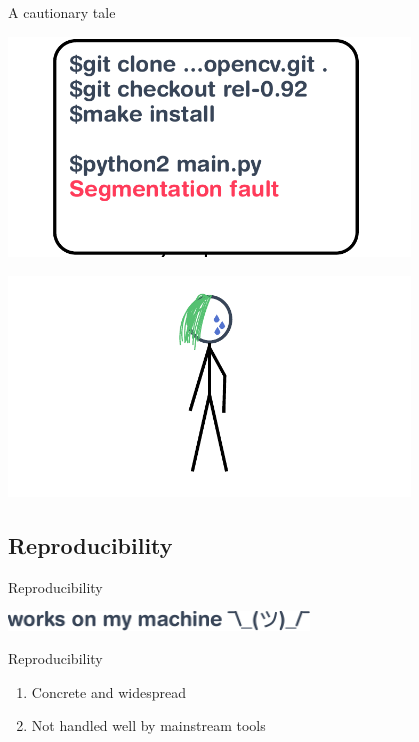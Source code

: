 \documentclass[aspectratio=169]{beamer}
\begin{document}
\begin{frame}{A cautionary tale}
{    }
     {
        \huge {}
        \begin{center}
        \includegraphics[width=0.8\textwidth]{img/princess-comics-try-7.pdf}
        \end{center}
    }
     {
        \begin{center}
        \huge {}
        \end{center}
        \begin{center}
        \includegraphics[width=0.8\textwidth]{img/princess-comics-outro.pdf}
        \end{center}
    }
\end{frame}

\subsection{Reproducibility}

\begin{frame}{Reproducibility}
    \begin{center}
        \includegraphics[width=0.6\textwidth]{img/works-on-my-machine.pdf}
    \end{center}

    \vspace{20pt}

     {
    \begin{alertblock}{Reproducibility}
    \begin{enumerate}
        \item<3-> Concrete and widespread
        \item<4-> Not handled well by mainstream tools
    \end{enumerate}
    \end{alertblock}
}
\end{frame}
\end{document}
